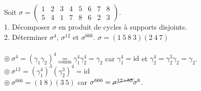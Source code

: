 \documentclass[11pt]{article}
\newcommand*{\id}{\text{id}}
\newcommand{\0}{\varnothing}
\newcommand*{\g}{\gamma}
\newcommand*{\s}{\sigma}
\begin{document}
\begin{ex}{}{}
    Soit $\s=\begin{pmatrix}1&2&3&4&5&6&7&8\\5&4&1&7&8&6&2&3\end{pmatrix}$.\\
    1. Décomposer $\s$ en produit de cycles à supports disjoints.\\
    2. Déterminer $\s^4$, $\s^{12}$ et $\s^{666}$.
    \tcblower
     $\s=(1~5~8~3)(2~4~7)$\\
    \\
    $\circledcirc ~ \s^4=(\g_1\g_2)^4\underset{\text{comm}}{=}\g_1^4\g_2^4=\g_2$ car $\g_1^4=\id$ et $\g_2^4=\g_2^3\g_2=\g_2$.\\
    $\circledcirc ~ \s^{12}=(\gamma_1^{4})^3(\g_2^3)^4=\id$\\
    $\circledcirc ~ \s^{666}=(1~8)(3~5)$ car $\s^{666}=\cancel{\s^{12\times55}}\s^6$.
\end{ex}
\end{document}
